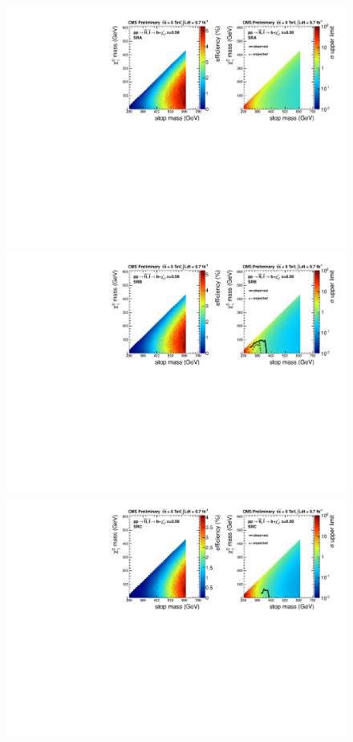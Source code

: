 \begin{figure}[hbt]
  \begin{center}
        \includegraphics[width=1.\linewidth]{plots/T2bw_x50_SRA.pdf}
        \includegraphics[width=1.\linewidth]{plots/T2bw_x50_SRB.pdf}
        \includegraphics[width=1.\linewidth]{plots/T2bw_x50_SRC.pdf}

\end{center}
\end{figure}

